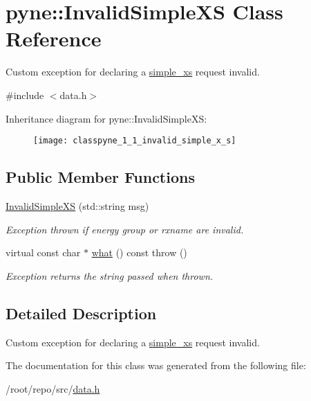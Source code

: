 \hypertarget{classpyne_1_1_invalid_simple_x_s}{}\section{pyne\+:\+:Invalid\+Simple\+XS Class Reference}
\label{classpyne_1_1_invalid_simple_x_s}


Custom exception for declaring a \hyperlink{structsimple__xs}{simple\+\_\+xs} request invalid.  




{\ttfamily \#include $<$data.\+h$>$}

Inheritance diagram for pyne\+:\+:Invalid\+Simple\+XS\+:\begin{figure}[H]
\begin{center}
\leavevmode
\texttt{[image: classpyne\_1\_1\_invalid\_simple\_x\_s]}
\end{center}
\end{figure}
\subsection*{Public Member Functions}
\begin{DoxyCompactItemize}
\item 
\mbox{\label{classpyne_1_1_invalid_simple_x_s_ad3bac5f587ea476c11a622024914d074}} 
\hyperlink{classpyne_1_1_invalid_simple_x_s_ad3bac5f587ea476c11a622024914d074}{Invalid\+Simple\+XS} (std\+::string msg)
\begin{DoxyCompactList}\small\item\em Exception thrown if energy group or rxname are invalid. \end{DoxyCompactList}\item 
\mbox{\label{classpyne_1_1_invalid_simple_x_s_a3812e69478a7d6420b21b6add7f9af44}} 
virtual const char $\ast$ \hyperlink{classpyne_1_1_invalid_simple_x_s_a3812e69478a7d6420b21b6add7f9af44}{what} () const  throw ()
\begin{DoxyCompactList}\small\item\em Exception returns the string passed when thrown. \end{DoxyCompactList}\end{DoxyCompactItemize}


\subsection{Detailed Description}
Custom exception for declaring a \hyperlink{structsimple__xs}{simple\+\_\+xs} request invalid. 

The documentation for this class was generated from the following file\+:\begin{DoxyCompactItemize}
\item 
/root/repo/src/\hyperlink{data_8h}{data.\+h}\end{DoxyCompactItemize}
